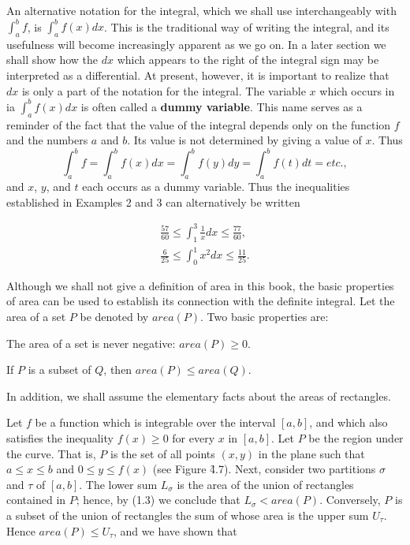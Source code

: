 An alternative notation for the integral, which we shall use interchangeably with $\int_{a}^{b} f$, is $\int_{a}^{b} f(x) dx$. This is the traditional way of writing the integral, and its usefulness will become increasingly apparent as we go on. In a later section we shall show how the $dx$ which appears to the right of the integral sign may be interpreted as a differential. At present, however,  it is important to realize that $dx$ is only a part of the notation for the integral. The variable $x$ which occurs in ia $\int_{a}^{b} f(x) dx$ is often called a \textbf{dummy variable}. This name serves as a reminder of the fact that the value of the integral depends only on the function $f$ and the numbers $a$ and $b$. Its value is not determined by giving a value of $x$. Thus
$$
\int_{a}^{b} f = \int_{a}^{b} f (x) dx = \int_{a}^{b} f (y) dy = \int_{a}^{b} f (t) dt = etc.,
$$
\noindent and $x$, $y$, and $t$ each occurs as a dummy variable. Thus the inequalities established in Examples 2 and 3 can alternatively be written

\begin{eqnarray*}
\frac{57}{60} \leq \int_{1}^{3} \frac{1}{x} dx \leq \frac{77}{60},\\
\frac{6}{25} \leq \int_{0}^{1} x^2 dx \leq \frac{11}{25}.
\end{eqnarray*}

 
Although we shall not give a definition of area in this book, the basic properties of area can be used to establish its connection with the definite integral. Let the area of a set $P$ be denoted by $area (P)$. 
Two basic properties are:

\begin{theorem} %
The area of a set is never negative: $area(P) \geq 0$.
\end{theorem}

\begin{theorem} %
If $P$ is a subset of $Q$, then $area(P) \leq area(Q)$.
\end{theorem}

In addition, we shall assume the elementary facts about the areas of rectangles.


Let $f$ be a function which is integrable over the interval $[a, b]$, and which also satisfies the inequality $f(x) \geq 0$ for every $x$ in $[a, b]$. Let $P$ be the region under the curve. That is, $P$ is the set of all points $(x, y)$ in the plane such that $a \leq x \leq b$ and $0 \leq y \leq f(x)$ (see Figure \f{4.7}). Next, consider two partitions $\sigma$ and $\tau$ of $[a,b]$. The lower sum $L_{\sigma}$ is the area of the union of rectangles contained in $P$; hence, by (1.3) we conclude that $L_{\sigma} < area (P)$. Conversely, $P$ is a subset of the union of rectangles the sum of whose area is the upper sum $U_{\tau}$. Hence $area (P) \leq U_{\tau}$, and we have shown that

